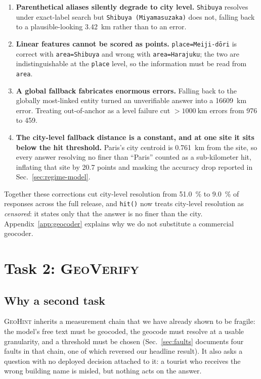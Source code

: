 \documentclass[10pt,a4paper]{article}
\begin{document}
\begin{enumerate}
\item \textbf{Parenthetical aliases silently degrade to city level.}
  \texttt{Shibuya} resolves under exact-label search but \texttt{Shibuya
  (Miyamasuzaka)} does not, falling back to a plausible-looking
  \SI{3.42}{\kilo\metre} rather than to an error.
\item \textbf{Linear features cannot be scored as points.}
  \texttt{place=Meiji-dōri} is correct with \texttt{area=Shibuya} and wrong with
  \texttt{area=Harajuku}; the two are indistinguishable at the \texttt{place}
  level, so the information must be read from \texttt{area}.
\item \textbf{A global fallback fabricates enormous errors.} Falling back to the
  globally most-linked entity turned an unverifiable answer into a
  \SI{16609}{\kilo\metre} error. Treating out-of-anchor as a level failure cut
  $>\SI{1000}{\kilo\metre}$ errors from \num{976} to \num{459}.
\item \textbf{The city-level fallback distance is a constant, and at one site it
  sits below the hit threshold.} Paris's city centroid is \SI{0.761}{\kilo\metre}
  from the site, so every answer resolving no finer than ``Paris'' counted as a
  sub-kilometer hit, inflating that site by \num{20.7} points and masking the
  accuracy drop reported in Sec.~\ref{sec:regime-model}.
\end{enumerate}

Together these corrections cut city-level resolution from \SI{51.0}{\percent}
to \SI{9.0}{\percent} of responses across the full release, and
\texttt{hit()} now treats city-level
resolution as \emph{censored}: it states only that the answer is no finer than
the city. Appendix~\ref{app:geocoder} explains why we do not substitute a
commercial geocoder.

\section{Task 2: \textsc{GeoVerify}}
\label{sec:geoverify}

\subsection{Why a second task}

\textsc{GeoHint} inherits a measurement chain that we have already shown to be
fragile: the model's free text must be geocoded, the geocode must resolve at a
usable granularity, and a threshold must be chosen (Sec.~\ref{sec:faults}
documents four faults in that chain, one of which reversed our headline
result). It also asks a question with no deployed decision attached to it: a
tourist who receives the wrong building name is misled, but nothing acts on the
answer.
\end{document}
